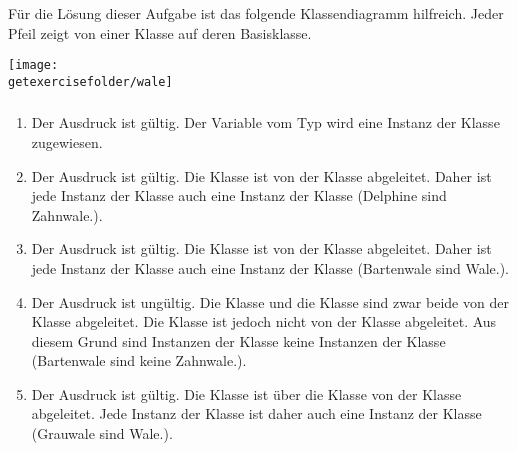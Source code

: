 \begin{frame}[t]%
  \frametitle{\theexercise}%

F\"ur die L\"osung dieser Aufgabe ist das folgende Klassendiagramm hilfreich.
Jeder Pfeil zeigt von einer Klasse auf deren Basisklasse.
\begin{center}
\texttt{[image: \\getexercisefolder/wale]}
\end{center}
\end{frame}

\begin{frame}[t]%
  \frametitle{\theexercise}%

\begin{enumerate}
\item
  Der Ausdruck ist g\"ultig.
  Der Variable  vom Typ  wird eine Instanz der Klasse  zugewiesen.
\item
  Der Ausdruck ist g\"ultig.
  Die Klasse  ist von der Klasse  abgeleitet.
  Daher ist jede Instanz der Klasse  auch eine Instanz der Klasse  (\glqq Delphine sind Zahnwale.\grqq).
\item
  Der Ausdruck ist g\"ultig.
  Die Klasse  ist von der Klasse  abgeleitet.
  Daher ist jede Instanz der Klasse  auch eine Instanz der Klasse  (\glqq Bartenwale sind Wale.\grqq).
\item
  Der Ausdruck ist ung\"ultig.
  Die Klasse  und die Klasse  sind zwar beide von der Klasse  abgeleitet.
  Die Klasse  ist jedoch nicht von der Klasse  abgeleitet.
  Aus diesem Grund sind Instanzen der Klasse  keine Instanzen der Klasse  (\glqq Bartenwale sind keine Zahnwale.\grqq).
\item
  Der Ausdruck ist g\"ultig.
  Die Klasse  ist \"uber die Klasse  von der Klasse  abgeleitet.
  Jede Instanz der Klasse  ist daher auch eine Instanz der Klasse  (\glqq Grauwale sind Wale.\grqq).
\end{enumerate}
\end{frame}

